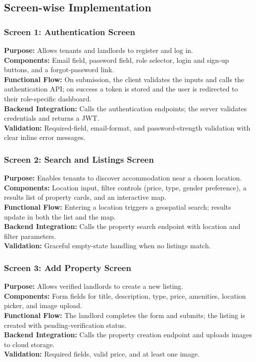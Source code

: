 \subsection{Screen-wise Implementation}

\subsubsection{Screen 1: Authentication Screen}

\textbf{Purpose:} Allows tenants and landlords to register and log in. \\
\textbf{Components:} Email field, password field, role selector, login and sign-up buttons, and a forgot-password link. \\
\textbf{Functional Flow:} On submission, the client validates the inputs and calls the authentication API; on success a token is stored and the user is redirected to their role-specific dashboard. \\
\textbf{Backend Integration:} Calls the authentication endpoints; the server validates credentials and returns a JWT. \\
\textbf{Validation:} Required-field, email-format, and password-strength validation with clear inline error messages.

\subsubsection{Screen 2: Search and Listings Screen}

\textbf{Purpose:} Enables tenants to discover accommodation near a chosen location. \\
\textbf{Components:} Location input, filter controls (price, type, gender preference), a results list of property cards, and an interactive map. \\
\textbf{Functional Flow:} Entering a location triggers a geospatial search; results update in both the list and the map. \\
\textbf{Backend Integration:} Calls the property search endpoint with location and filter parameters. \\
\textbf{Validation:} Graceful empty-state handling when no listings match.

\subsubsection{Screen 3: Add Property Screen}

\textbf{Purpose:} Allows verified landlords to create a new listing. \\
\textbf{Components:} Form fields for title, description, type, price, amenities, location picker, and image upload. \\
\textbf{Functional Flow:} The landlord completes the form and submits; the listing is created with pending-verification status. \\
\textbf{Backend Integration:} Calls the property creation endpoint and uploads images to cloud storage. \\
\textbf{Validation:} Required fields, valid price, and at least one image.

